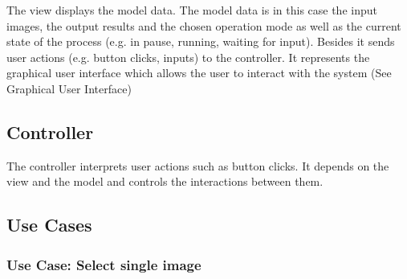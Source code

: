 \documentclass[parskip=full]{scrartcl}
\begin{document}
The view displays the model data. The model data is in this case the input images,  the output results and the chosen operation mode as well as the current state of the process (e.g. in pause, running, waiting for input). Besides it sends user actions (e.g. button clicks, inputs) to the controller. It represents the graphical user interface which allows the user to interact with the system (See Graphical User Interface)

\subsection{Controller}

The controller interprets user actions such as button clicks. It depends on the view and the model and controls the interactions between them.

\pagebreak





\subsection{Use Cases}


\subsubsection {Use Case: Select single image}
\end{document}
